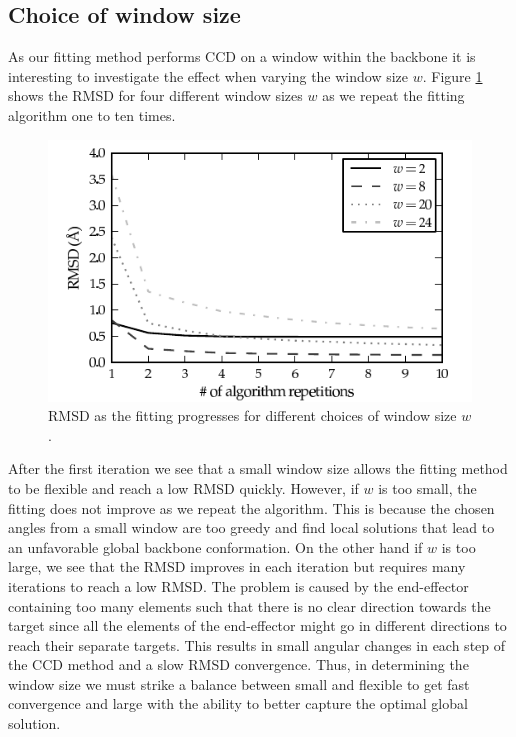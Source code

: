 \subsection{Choice of window size}
As our fitting method performs CCD on a window within the backbone it is interesting to investigate the effect when varying the window size $w$.
Figure \ref{fig:rmsd_convergence} shows the RMSD for four different window sizes $w$ as we repeat the fitting algorithm one to ten times.
\begin{figure}
	\centering
	\hspace*{-3.5mm}\includegraphics[width=1.1\columnwidth]{figures/plot_rmsd_convergence}
	\caption{RMSD as the fitting progresses for different choices of window size $w$.}
	\label{fig:rmsd_convergence}
\end{figure}
After the first iteration we see that a small window size allows the fitting method to be flexible and reach a low RMSD quickly.
However, if $w$ is too small, the fitting does not improve as we repeat the algorithm.
This is because the chosen angles from a small window are too greedy and find local solutions that lead to an unfavorable global backbone conformation.
On the other hand if $w$ is too large, we see that the RMSD improves in each iteration but requires many iterations to reach a low RMSD.
The problem is caused by the end-effector containing too many elements such that there is no clear direction towards the target since all the elements of the end-effector might go in different directions to reach their separate targets.
This results in small angular changes in each step of the CCD method and a slow RMSD convergence.
Thus, in determining the window size we must strike a balance between small and flexible to get fast convergence and large with the ability to better capture the optimal global solution.
